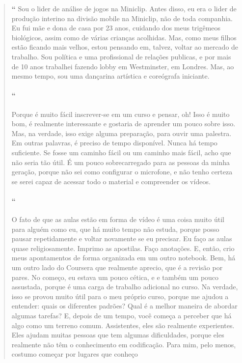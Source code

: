 \begin{quotation}%
\begin{small}
{\large\textbf{``}}%
Sou o lider de análise de jogos na Miniclip. Antes disso, eu era o lider de produção interino na divisão mobile na Miniclip, não de toda companhia. Eu fui mãe e dona de casa por 23 anos, cuidando dos meus trigêmeos biológicos, assim como de várias crianças acolhidas. Mas, como meus filhos estão ficando mais velhos, estou pensando em, talvez, voltar ao mercado de trabalho. Sou política e uma profissional de relações publicas, e por mais de 10 anos trabalhei fazendo lobby em Westminster, em Londres. Mas, ao mesmo tempo, sou uma dançarina artística e coreógrafa iniciante. 

\paragraph{``}
Porque é muito fácil inscrever-se em um curso e pensar, oh! Isso é muito bom, é realmente interessante e gostaria de aprender um pouco sobre isso. Mas, na verdade, isso exige alguma preparação, para ouvir uma palestra. Em outras palavras, é preciso de tempo disponível. Nunca há tempo suficiente. Se fosse um caminho fácil ou um caminho mais fácil, acho que não seria tão útil. É um pouco sobrecarregado para as pessoas da minha geração, porque não sei como configurar o microfone, e não tenho certeza se serei capaz de acessar todo o material e compreender os vídeos. 

\paragraph{``}
O fato de que as aulas estão em forma de vídeo é uma coisa muito útil  para alguém como eu, que há muito tempo não estuda, porque posso pausar repetidamente e voltar novamente se eu precisar. Eu faço as aulas quase religiosamente. Imprimo as apostilas. Faço anotações. E, então, crio meus apontamentos de forma organizada em um outro notebook. Bem, há um outro lado do Coursera que realmente aprecio, que é a revisão por pares. No começo, eu estava um pouco cética, e e também um pouco assustada, porque é uma carga de trabalho adicional no curso. Na verdade, isso se provou muito útil para o meu próprio curso, porque me ajudou a entender: quais os diferentes padrões? Qual é a melhor maneira de abordar algumas tarefas? E, depois de um tempo, você começa a perceber que há algo como um terreno comum. Assistentes, eles são realmente experientes. Eles ajudam muitas pessoas que tem algumas dificuldades, porque eles realmente não têm o conhecimento em codificação. Para mim, pelo menos, costumo começar por lugares que conheço 


\end{small}
\end{quotation}
